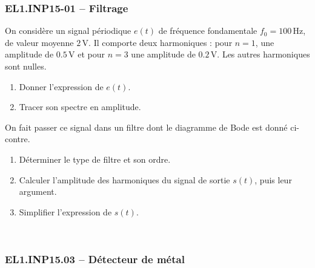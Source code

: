 \newpage
\subsubsection*{EL1.INP15-01 -- Filtrage  \lesdeux}

On considère un signal périodique $e(t)$ de fréquence fondamentale $f_0 = 100\, \text{Hz}$, de valeur moyenne $2\, \text{V}$. Il comporte deux harmoniques : pour $n = 1$, une amplitude de $0.5\, \text{V}$ et pour $n = 3$ une amplitude de $0.2\, \text{V}$. Les autres harmoniques sont nulles.





\begin{minipage}[t]{0.4\textwidth} %

\begin{enumerate}
    \item Donner l'expression de $e(t)$.
    \item Tracer son spectre en amplitude.
\end{enumerate}

On fait passer ce signal dans un filtre dont le diagramme de Bode est donné ci-contre.

\begin{enumerate}[resume]
    
    \item Déterminer le type de filtre et son ordre.
    \item Calculer l'amplitude des harmoniques du signal de sortie $s(t)$, puis leur argument.
    \item Simplifier l'expression de $s(t)$.
\end{enumerate}

\end{minipage}
\hfill %
\begin{minipage}[t]{0.55\textwidth} %
~
\vspace{-1em}




\end{minipage}


\newpage
\subsubsection*{EL1.INP15.03 -- Détecteur de métal  \lesdeux}

